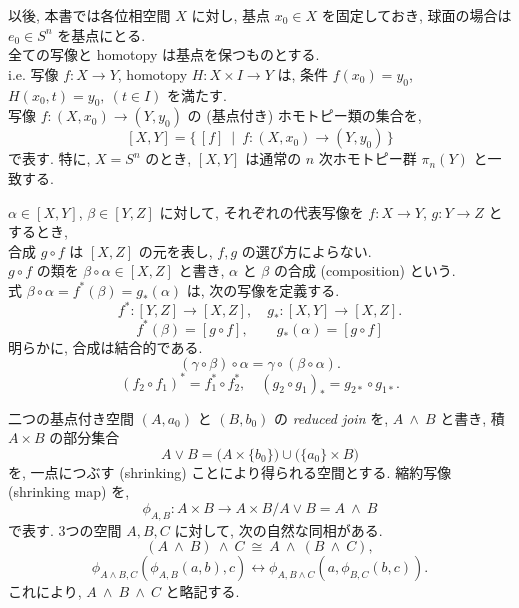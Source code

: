 \documentclass[12pt, leqno]{ltjsarticle}
\newcommand{\shrink}{\phi}
\numberwithin{equation}{section}
\theoremstyle{plain}
\theoremstyle{definition}
\theoremstyle{remark}
\begin{document}
以後, 本書では各位相空間 $X$ に対し, 
基点 $x_0\in X$ を固定しておき, 球面の場合は $e_0\in S^n$ を基点にとる. \\
全ての写像と homotopy は基点を保つものとする.\\
i.e.
写像 \(f:X\to Y\),
 homotopy  \(H:X\times I\to Y\)
は, 条件 
\(f(x_0) = y_0\), 
\(H(x_0, t) = y_0,\ (t\in I)\)
を満たす.\\
写像 $f:(X,x_0)\to (Y,y_0)$ の (基点付き) ホモトピー類の集合を,
\[
[X,Y]=\{\, [f]\ \mid\ f:(X,x_0)\to (Y,y_0)\,\}
\]
で表す. 特に, $X=S^n$ のとき,
$[X,Y]$ は通常の $n$ 次ホモトピー群 $\pi_n(Y)$ と一致する. 

$\alpha\in[X,Y]$, $\beta\in[Y,Z]$ に対して,
それぞれの代表写像を $f:X\to Y$, $g:Y\to Z$ とするとき, \\
合成
\(g\circ f\) は \([X,Z]\) の元を表し,
\(f, g\) の選び方によらない.\\
\(g\circ f\) の類を
\(\beta\circ \alpha \in [X,Z]\)
と書き, \(\alpha\) と \(\beta\) の合成 (composition) という.\\
式 \(\beta\circ \alpha = f^*(\beta) = g_*(\alpha)\)
は, 次の写像を定義する.
\[
f^*:[Y,Z]\to[X,Z],\quad g_*:[X,Y]\to[X,Z].
\]
\[
f^*(\beta)=[g\circ f],\qquad g_*(\alpha)=[g\circ f]
\]
明らかに, 合成は結合的である. 
\[
(\gamma\circ \beta)\circ\alpha=\gamma\circ(\beta\circ\alpha).
\]
\[
(f_2\circ f_1)^*=f_1^*\circ f_2^*,\quad 
(g_2\circ g_1)_*=g_{2*}\circ g_{1*}.
\]

二つの基点付き空間 $(A,a_0)$ と $(B,b_0)$ の \emph{reduced join} を, 
$A\ \wedge\ B$ と書き, 積 $A\times B$ の部分集合
\[
A\vee B=\bigl(A\times\{b_0\}\bigr)\cup\bigl(\{a_0\}\times B\bigr)
\]
を, 一点につぶす (shrinking) ことにより得られる空間とする. 
縮約写像 (shrinking map) を,
\[
\shrink_{A,B}:A\times B\longrightarrow
A\times B/A\vee B = A\ \wedge\ B
\]
で表す. 3つの空間 $A,B,C$ に対して, 次の自然な同相がある.
\[
(A\ \wedge\ B)\ \wedge\ C\ \cong\ A\ \wedge\ (B\ \wedge\ C),
\]
\[
\phi_{A\wedge B, C}(\phi_{A,B}(a,b),c)\longleftrightarrow
\phi_{A,B\wedge C}(a, \phi_{B,C}(b,c)).
\]
これにより, $A\ \wedge\ B\ \wedge\ C$ と略記する. 
\end{document}
